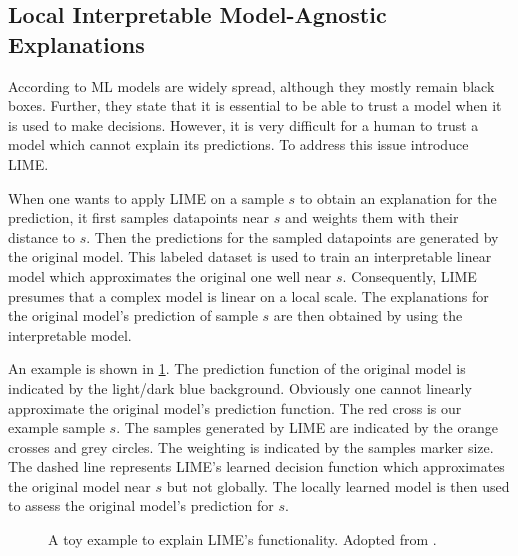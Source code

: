 \subsection{Local Interpretable Model-Agnostic Explanations}
\label{chp:fundamentals:sec:machine_learning:subsec:LIME}
According to \textcite{Ribeiro:2016} \ac{ML} models are widely spread, although they mostly remain black boxes.
Further, they state that it is essential to be able to trust a model when it is used to make decisions.
However, it is very difficult for a human to trust a model which cannot explain its predictions.
To address this issue \textcite{Ribeiro:2016} introduce \ac{LIME}.

When one wants to apply \ac{LIME} on a sample $s$ to obtain an explanation for the prediction, it first samples datapoints near $s$ and weights them with their distance to $s$.
Then the predictions for the sampled datapoints are generated by the original model.
This labeled dataset is used to train an interpretable linear model which approximates the original one well near $s$.
Consequently, \ac{LIME} presumes that a complex model is linear on a local scale.
The explanations for the original model's prediction of sample $s$ are then obtained by using the interpretable model. \parencite{Ribeiro:2016}

An example is shown in \cref{fig:fundamentals:LIME}.
The prediction function of the original model is indicated by the light/dark blue background.
Obviously one cannot linearly approximate the original model's prediction function.
The red cross is our example sample $s$.
The samples generated by \ac{LIME} are indicated by the orange crosses and grey circles.
The weighting is indicated by the samples marker size.
The dashed line represents \ac{LIME}'s learned decision function which approximates the original model near $s$ but not globally.
The locally learned model is then used to assess the original model's prediction for $s$.
\begin{figure}[htpb]
    \centering
    
    \caption[LIME Example Data]{A toy example to explain \ac{LIME}'s functionality. Adopted from \textcite{Ribeiro:2016}.}\label{fig:fundamentals:LIME}
\end{figure}
